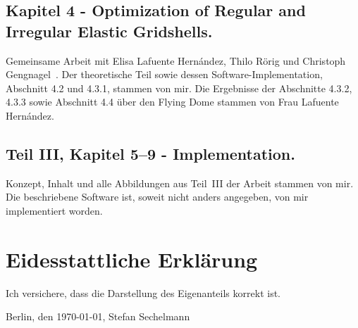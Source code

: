 \documentclass[11pt]{amsart}
\begin{document}
\subsection*{Kapitel 4 - Optimization of Regular and Irregular Elastic Gridshells.}
Gemeinsame Arbeit mit Elisa Lafuente Hernández, Thilo R\"{o}rig und Christoph Gengnagel~\cite{Lafuente2012}.
Der theoretische Teil sowie dessen Software-Implementation, Abschnitt 4.2 und 4.3.1, stammen von mir. Die Ergebnisse der Abschnitte 4.3.2, 4.3.3 sowie Abschnitt 4.4 über den Flying Dome stammen von Frau Lafuente Hernández. 

\subsection*{Teil III, Kapitel 5--9 - Implementation.}
Konzept, Inhalt und alle Abbildungen aus Teil~III der Arbeit stammen von mir. Die beschriebene Software ist, soweit nicht anders angegeben, von mir implementiert worden.


\section{Eidesstattliche Erklärung}
Ich versichere, dass die Darstellung des Eigenanteils korrekt ist.


\vspace{2cm}
Berlin, den \today, Stefan Sechelmann




\end{document}
